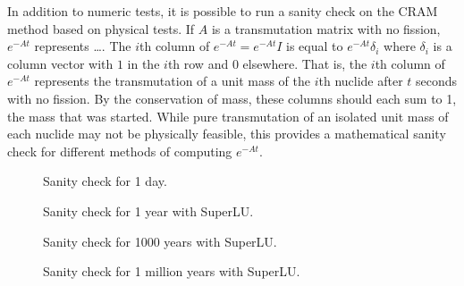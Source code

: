 In addition to numeric tests, it is possible to run a sanity check on the CRAM
method based on physical tests. If $A$ is a transmutation matrix with no
fission, $e^{-At}$ represents {\color{red}\ldots}. The $i$th column of
$e^{-At}=e^{-At}I$ is equal to $e^{-At}\delta_{i}$ where $\delta_i$ is a
column vector with $1$ in the $i$th row and $0$ elsewhere. That is, the $i$th
column of $e^{-At}$ represents the transmutation of a unit mass of the $i$th
nuclide after $t$ seconds with no fission. By the conservation of mass, these
columns should each sum to 1, the mass that was started. While pure
transmutation of an isolated unit mass of each nuclide may not be physically
feasible, this provides a mathematical sanity check for different methods of
computing $e^{-At}$.


\begin{figure}[!ht]
\centering
\resizebox{0.9\textwidth}{!}{}
\caption{Sanity check for 1 day.}
\label{fig:nofission-pwru50-1-day}
\end{figure}

\begin{figure}[!ht]
\centering
\resizebox{0.9\textwidth}{!}{}
\caption{Sanity check for 1 year with SuperLU.}
\label{fig:nofission-pwru50-1-year}
\end{figure}

\begin{figure}[!ht]
\centering
\resizebox{0.9\textwidth}{!}{}
\caption{Sanity check for 1000 years with SuperLU.}
\label{fig:nofission-pwru50-1000-years}
\end{figure}

\begin{figure}[!ht]
\centering
\resizebox{0.9\textwidth}{!}{}
\caption{Sanity check for 1 million years with SuperLU.}
\label{fig:nofission-pwru50-1-million-years}
\end{figure}
